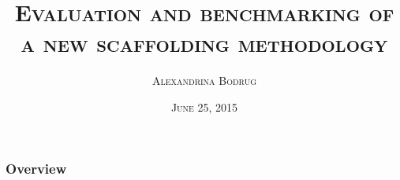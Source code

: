 \documentclass{beamer}
\title[\textsc{Scaffolding}]{\textsc{Evaluation and benchmarking of a new scaffolding methodology}} %
\author{\textsc{Alexandrina Bodrug}} %
\institute[\textsc{genscale, irisa}] %
{
\textit{\textsc{\tiny Supervisors: Pr. Rumen Andonov \& Dr. Dominique Lavenier}} \\
\vspace*{1cm}
\textsc{University Rennes 1} \\ %
\textit{\textsc{\tiny Bioinformatics and Genomics Master}} %
}
\date{\tiny \textsc{June 25, 2015}} %
\begin{document}
\begin{frame}
\titlepage %
\end{frame}

\begin{frame}
\frametitle{Overview} %
\tableofcontents %
\end{frame}


\end{document}
